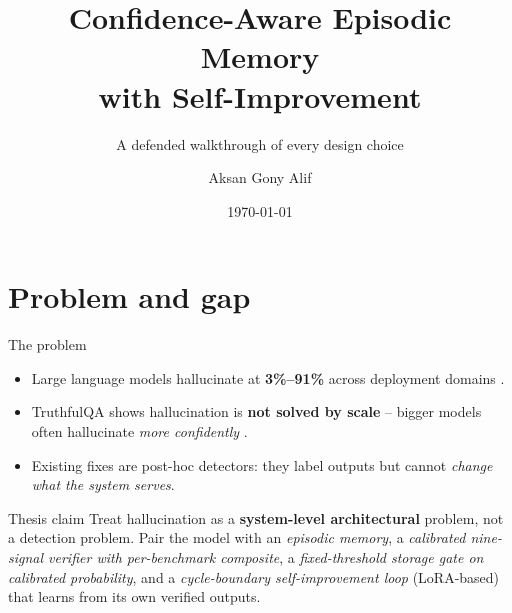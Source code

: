 \documentclass[10pt,aspectratio=169]{beamer}
\title[CAEM]{Confidence-Aware Episodic Memory \\ with Self-Improvement}
\subtitle{A defended walkthrough of every design choice}
\author{Aksan Gony Alif}
\institute[BRAC University]{BRAC University \\ CSE400 Senior Thesis}
\date{\today}
\begin{document}
\begin{frame}\titlepage\end{frame}

\section*{Problem and gap}

\begin{frame}{The problem}
  \begin{itemize}\small
    \item Large language models hallucinate at \textbf{3\%--91\%} across deployment domains
          \tiny\cite{alkaissi2023artificial,10.1145/3649506}\normalsize.
    \item TruthfulQA shows hallucination is \textbf{not solved by scale} -- bigger models often hallucinate \emph{more confidently} \tiny\cite{lin-etal-2022-truthfulqa}\normalsize.
    \item Existing fixes are \alert{post-hoc detectors}: they label outputs but cannot \emph{change what the system serves}.
  \end{itemize}

  \vspace{0.5em}
  \begin{block}{Thesis claim}
    Treat hallucination as a \textbf{system-level architectural} problem, not a detection problem.
    Pair the model with an \emph{episodic memory}, a \emph{calibrated nine-signal verifier with per-benchmark composite}, a \emph{fixed-threshold storage gate on calibrated probability}, and a \emph{cycle-boundary self-improvement loop} (LoRA-based) that learns from its own verified outputs.
  \end{block}
\end{frame}
\end{document}
